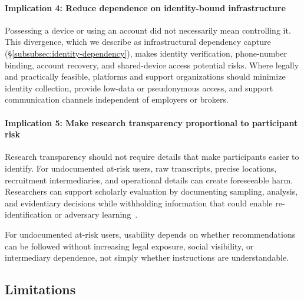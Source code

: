\documentclass[conference,compsoc]{IEEEtran}
\begin{document}
\paragraph{\textbf{Implication 4: Reduce dependence on identity-bound infrastructure}}

Possessing a device or using an account did not necessarily mean controlling it. This divergence, which we describe as infrastructural dependency capture (\S\ref{subsubsec:identity-dependency}), makes identity verification, phone-number binding, account recovery, and shared-device access potential risks. Where legally and practically feasible, platforms and support organizations should minimize identity collection, provide low-data or pseudonymous access, and support communication channels independent of employers or brokers.

\paragraph{\textbf{Implication 5: Make research transparency proportional to participant risk}}

Research transparency should not require details that make participants easier to identify. For undocumented at-risk users, raw transcripts, precise locations, recruitment intermediaries, and operational details can create foreseeable harm. Researchers can support scholarly evaluation by documenting sampling, analysis, and evidentiary decisions while withholding information that could enable re-identification or adversary learning~\cite{bellini2024sok}.

For undocumented at-risk users, usability depends on whether recommendations can be followed without increasing legal exposure, social visibility, or intermediary dependence, not simply whether instructions are understandable.





\subsection{Limitations}
\end{document}
